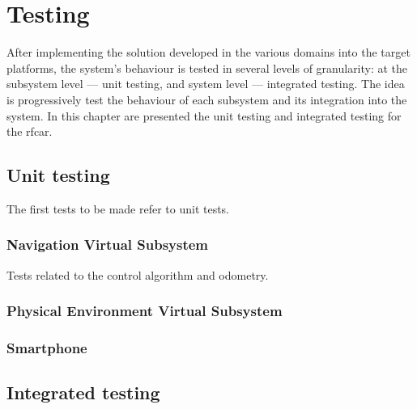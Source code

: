 \chapter{Testing}%
\label{ch:testing}
After implementing the solution developed in the various domains into the
target platforms, the system's behaviour is tested in several levels of
granularity: at the subsystem level --- unit testing, and system level ---
integrated testing. The idea is progressively test the behaviour of each
subsystem and its integration into the system.
In this chapter are presented the unit testing and integrated testing for the \gls{rfcar}.
%
\section{Unit testing}%
\label{sec:unit-testing}
The first tests to be made refer to unit tests.
    \subsection{Navigation Virtual Subsystem}%
    \label{sec:navig-virt-subsyst-test}
    
    \label{sec:nvs-tests}
Tests related to the control algorithm and odometry.

    
    \subsection{Physical Environment Virtual Subsystem}%
    \label{sec:phys-envir-virt-design}
    
    \subsection{Smartphone}%
    \label{sec:smartphone-testing}
    
\section{Integrated testing}%
\label{sec:integrated-testing}

%
%
